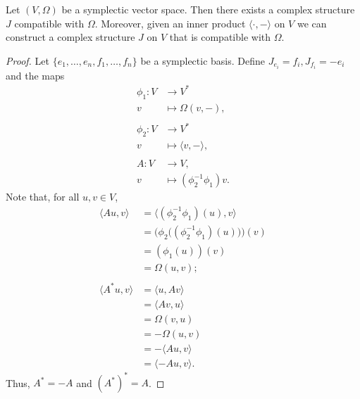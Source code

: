 \documentclass[misc]{subfiles}
\begin{document}
\begin{Prp}
    Let $(V,\Omega)$ be a symplectic vector space. Then there exists a complex structure $J$ compatible with $\Omega$. Moreover, given an inner product $\langle \cdot, -\rangle$ on $V$ we can construct a complex structure $J$ on $V$ that is compatible with $\Omega$.

    \begin{proof}
    
        Let $\{e_1,\dots,e_n,f_1,\dots,f_n\}$ be a symplectic basis. Define $J_{e_i}=f_i, J_{f_i}=-e_i$ and the maps
        \begin{align*}
            \phi_1:V&\to V^\ast \\
            v&\mapsto \Omega(v,-), \\ \\
            \phi_2:V&\to V^\ast \\
            v&\mapsto \langle v,-\rangle, \\ \\
            A:V&\to V, \\
            v&\mapsto (\phi_2^{-1}\phi_1)v.
        \end{align*}
        Note that, for all $u,v\in V$,
        \begin{align*}
            \langle Au, v \rangle &= \langle (\phi_2^{-1}\phi_1)(u), v \rangle \\
                                  &= \big(\phi_2\big((\phi_2^{-1}\phi_1)(u)\big)\big) (v) \\
                                  &= (\phi_1(u))(v) \\
                                  &= \Omega(u,v); \\ \\
            \langle A^\ast u, v \rangle &= \langle u, Av \rangle \\
                                        &= \langle Av, u \rangle \tag{Since our vector space is real.} \\
                                        &= \Omega(v,u) \\
                                        &= -\Omega(u,v) \\
                                        &= -\langle Au, v \rangle \\
                                        &= \langle -Au, v \rangle.
        \end{align*}
        Thus, $A^\ast=-A$ and $(A^\ast)^\ast=A$. 
    \end{proof}
\end{Prp}
\end{document}
